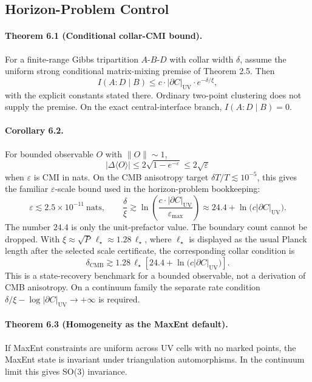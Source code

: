 \subsection{Horizon-Problem Control}

\paragraph{\textbf{Theorem 6.1 (Conditional collar-CMI bound).}}
For a finite-range Gibbs tripartition \(A\)-\(B\)-\(D\) with collar width \(\delta\), assume the
uniform strong conditional matrix-mixing premise of Theorem 2.5. Then
\[
I(A:D\mid B)\le c\cdot |\partial C|_{\mathrm{UV}}\cdot e^{-\delta/\xi},
\]
with the explicit constants stated there. Ordinary two-point clustering does not supply the
premise. On the exact central-interface branch, \(I(A:D\mid B)=0\).

\paragraph{\textbf{Corollary 6.2.}}
For bounded observable \(O\) with \(\|O\|\sim1\),
\[
|\Delta\langle O\rangle|\le 2\sqrt{1-e^{-\varepsilon}}\le2\sqrt{\varepsilon}
\]
when \(\varepsilon\) is CMI in nats.
On the CMB anisotropy target \(\delta T/T\lesssim 10^{-5}\), this gives the familiar
\(\varepsilon\)-scale bound used in the horizon-problem bookkeeping:
\[
\varepsilon\lesssim 2.5\times 10^{-11}\ \text{nats},
\qquad
\frac{\delta}{\xi}\gtrsim
\ln\!\left(\frac{c\cdot |\partial C|_{\mathrm{UV}}}{\varepsilon_{\max}}\right)
\approx 24.4+\ln\!\bigl(c|\partial C|_{\mathrm{UV}}\bigr).
\]
The number \(24.4\) is only the unit-prefactor value. The boundary count cannot be dropped. With
\(\xi\approx \sqrt{P}\,\ell_\star\approx 1.28\,\ell_\star\), where \(\ell_\star\) is displayed as the usual Planck length after the selected scale certificate, the corresponding collar
condition is
\[
\delta_{\mathrm{CMB}}
\gtrsim1.28\,\ell_\star
\left[24.4+\ln\!\bigl(c|\partial C|_{\mathrm{UV}}\bigr)\right].
\]
This is a state-recovery benchmark for a bounded observable, not a derivation of CMB anisotropy.
On a continuum family the separate rate condition
\(\delta/\xi-\log|\partial C|_{\mathrm{UV}}\to+\infty\) is required.

\paragraph{\textbf{Theorem 6.3 (Homogeneity as the MaxEnt default).}}
If MaxEnt constraints are uniform across UV cells with no marked points, the MaxEnt state is
invariant under triangulation automorphisms. In the continuum limit this gives SO(3) invariance.

